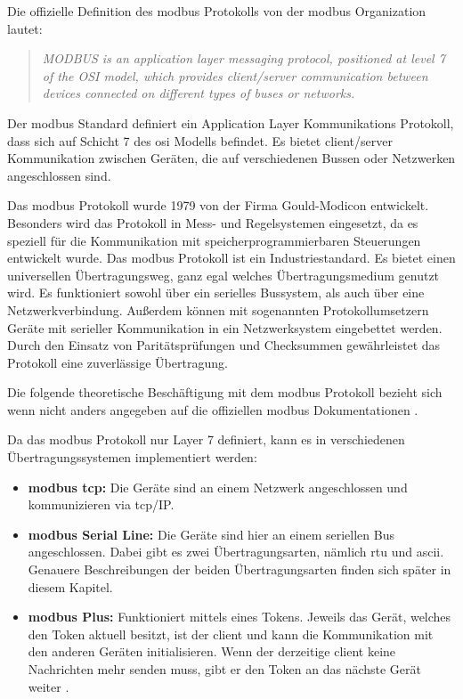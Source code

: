 \label{modbus_kapitel}
Die offizielle Definition des \gls{modbus} Protokolls von der \gls{modbus} Organization \cite{Modbus_Organization_AP:2012} lautet:
\begin{quotation}
	\emph{
		MODBUS is an application layer messaging protocol, positioned at level 7 of the OSI model, which provides client/server communication between devices connected on different types of buses or networks.}
\end{quotation}

Der \gls{modbus} Standard definiert ein Application Layer Kommunikations Protokoll, dass sich auf Schicht 7 des \gls{osi} Modells befindet. Es bietet \gls{client}/\gls{server} Kommunikation zwischen Geräten, die auf verschiedenen Bussen oder Netzwerken angeschlossen sind.

Das \gls{modbus} Protokoll wurde 1979 von der Firma Gould-Modicon entwickelt. Besonders wird das Protokoll in Mess- und Regelsystemen eingesetzt, da es speziell für die Kommunikation mit speicherprogrammierbaren Steuerungen entwickelt wurde. Das \gls{modbus} Protokoll ist ein Industriestandard. Es bietet einen universellen Übertragungsweg, ganz egal welches Übertragungsmedium genutzt wird. Es funktioniert sowohl über ein serielles Bussystem, als auch über eine Netzwerkverbindung. Außerdem können mit sogenannten Protokollumsetzern Geräte mit serieller Kommunikation in ein Netzwerksystem eingebettet werden. Durch den Einsatz von Paritätsprüfungen und Checksummen gewährleistet das Protokoll eine zuverlässige Übertragung. \cite{KUNBUS_GmbH:o.J., kvm-concepts_GmbH:2022}


Die folgende theoretische Beschäftigung mit dem \gls{modbus} Protokoll bezieht sich wenn nicht anders angegeben auf die offiziellen \gls{modbus} Dokumentationen \cite{Modbus_Organization_AP:2012, Modbus_Organization_SL:2012}. 

Da das \gls{modbus} Protokoll nur Layer 7 definiert, kann es in verschiedenen Übertragungssystemen implementiert werden:
\begin{itemize}
	\item \textbf{\gls{modbus} \acs{tcp}:} Die Geräte sind an einem Netzwerk angeschlossen und kommunizieren via \acs{tcp}/IP.
	\item \textbf{\gls{modbus} Serial Line:} Die Geräte sind hier an einem seriellen Bus angeschlossen. Dabei gibt es zwei Übertragungsarten, nämlich \acs{rtu} und \acs{ascii}. Genauere Beschreibungen der beiden Übertragungsarten finden sich später in diesem Kapitel.
	\item \textbf{\gls{modbus} Plus:} Funktioniert mittels eines Tokens. Jeweils das Gerät, welches den Token aktuell besitzt, ist der \gls{client} und kann die Kommunikation mit den anderen Geräten initialisieren. Wenn der derzeitige \gls{client} keine Nachrichten mehr senden muss, gibt er den Token an das nächste Gerät weiter \cite{Rinaldi:2016}.
\end{itemize}


